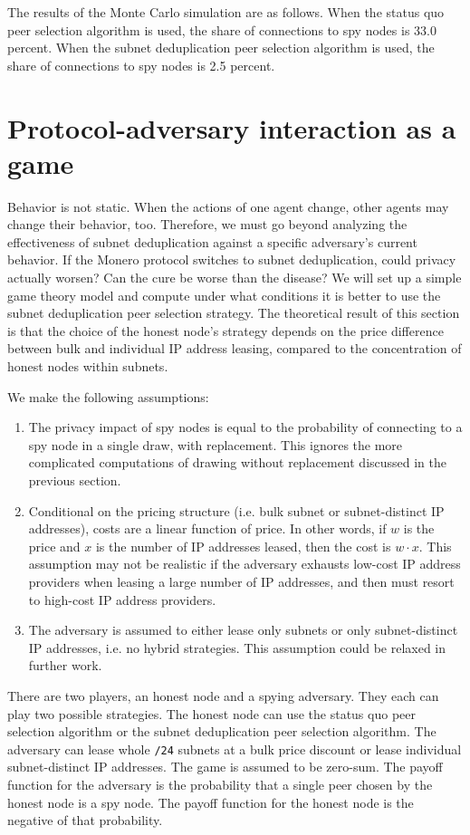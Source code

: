 \documentclass[usletter,11pt,english,openany]{article}
\begin{document}
The results of the Monte Carlo simulation are as follows. When the
status quo peer selection algorithm is used, the share of connections
to spy nodes is 33.0 percent. When the subnet deduplication peer selection
algorithm is used, the share of connections to spy nodes is 2.5 percent. 

\section{Protocol-adversary interaction as a game}

Behavior is not static. When the actions of one agent change, other
agents may change their behavior, too. Therefore, we must go beyond
analyzing the effectiveness of subnet deduplication against a specific
adversary's current behavior. If the Monero protocol switches to subnet
deduplication, could privacy actually worsen? Can the cure be worse
than the disease? We will set up a simple game theory model and compute
under what conditions it is better to use the subnet deduplication
peer selection strategy. The theoretical result of this section is
that the choice of the honest node's strategy depends on the price
difference between bulk and individual IP address leasing, compared
to the concentration of honest nodes within subnets.

We make the following assumptions:
\begin{enumerate}
\item The privacy impact of spy nodes is equal to the probability of connecting
to a spy node in a single draw, with replacement. This ignores the
more complicated computations of drawing without replacement discussed
in the previous section.
\item Conditional on the pricing structure (i.e. bulk subnet or subnet-distinct
IP addresses), costs are a linear function of price. In other words,
if $w$ is the price and $x$ is the number of IP addresses leased,
then the cost is $w\cdot x$. This assumption may not be realistic
if the adversary exhausts low-cost IP address providers when leasing
a large number of IP addresses, and then must resort to high-cost
IP address providers.
\item The adversary is assumed to either lease only subnets or only subnet-distinct
IP addresses, i.e. no hybrid strategies. This assumption could be
relaxed in further work.
\end{enumerate}
There are two players, an honest node and a spying adversary. They
each can play two possible strategies. The honest node can use the
status quo peer selection algorithm or the subnet deduplication peer
selection algorithm. The adversary can lease whole \texttt{/24} subnets
at a bulk price discount or lease individual subnet-distinct IP addresses.
The game is assumed to be zero-sum. The payoff function for the adversary
is the probability that a single peer chosen by the honest node is
a spy node. The payoff function for the honest node is the negative
of that probability.
\end{document}
